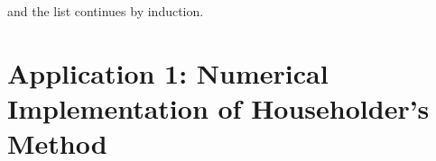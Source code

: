 \documentclass{article}
\begin{document}
and the list continues by induction.

\section{Application 1: Numerical Implementation of Householder's Method}
 
\end{document}
